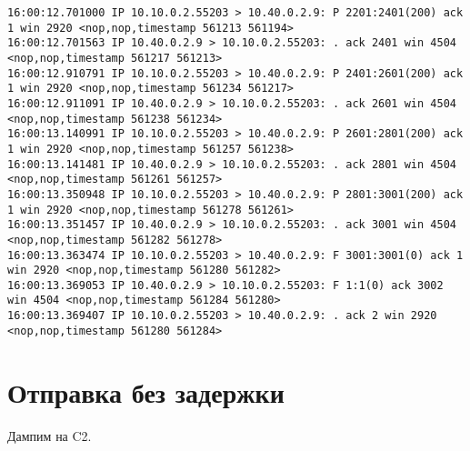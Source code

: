 \documentclass[a4paper,12pt]{article}
\begin{document}
\begin{Verbatim}
16:00:12.701000 IP 10.10.0.2.55203 > 10.40.0.2.9: P 2201:2401(200) ack 1 win 2920 <nop,nop,timestamp 561213 561194>
16:00:12.701563 IP 10.40.0.2.9 > 10.10.0.2.55203: . ack 2401 win 4504 <nop,nop,timestamp 561217 561213>
16:00:12.910791 IP 10.10.0.2.55203 > 10.40.0.2.9: P 2401:2601(200) ack 1 win 2920 <nop,nop,timestamp 561234 561217>
16:00:12.911091 IP 10.40.0.2.9 > 10.10.0.2.55203: . ack 2601 win 4504 <nop,nop,timestamp 561238 561234>
16:00:13.140991 IP 10.10.0.2.55203 > 10.40.0.2.9: P 2601:2801(200) ack 1 win 2920 <nop,nop,timestamp 561257 561238>
16:00:13.141481 IP 10.40.0.2.9 > 10.10.0.2.55203: . ack 2801 win 4504 <nop,nop,timestamp 561261 561257>
16:00:13.350948 IP 10.10.0.2.55203 > 10.40.0.2.9: P 2801:3001(200) ack 1 win 2920 <nop,nop,timestamp 561278 561261>
16:00:13.351457 IP 10.40.0.2.9 > 10.10.0.2.55203: . ack 3001 win 4504 <nop,nop,timestamp 561282 561278>
16:00:13.363474 IP 10.10.0.2.55203 > 10.40.0.2.9: F 3001:3001(0) ack 1 win 2920 <nop,nop,timestamp 561280 561282>
16:00:13.369053 IP 10.40.0.2.9 > 10.10.0.2.55203: F 1:1(0) ack 3002 win 4504 <nop,nop,timestamp 561284 561280>
16:00:13.369407 IP 10.10.0.2.55203 > 10.40.0.2.9: . ack 2 win 2920 <nop,nop,timestamp 561280 561284>

\end{Verbatim}

\section{Отправка без задержки}

Дампим на C2.
\end{document}
